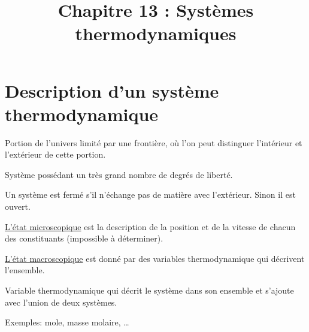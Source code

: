 \documentclass[12pt]{article}
\title{Chapitre 13 : Systèmes thermodynamiques}
\author{}
\date{}
\theoremstyle{cstyle}{\newtheorem{definition}{Définition}[section]}
\theoremstyle{cstyle}{\newtheorem{proposition}[definition]{Propriété}}
\theoremstyle{mystyle}{\newtheorem{theorem}[definition]{Théorème}}
\theoremstyle{mystyle}{\newtheorem{lemma}[definition]{Lemme}}
\theoremstyle{mystyle}{\newtheorem{corollary}[definition]{Corollaire}}
\theoremstyle{mystyle}{\newtheorem*{remark}{Remarque}}
\theoremstyle{mystyle}{\newtheorem*{remarks}{Remarques}}
\theoremstyle{mystyle}{\newtheorem*{example}{Exemple}}
\theoremstyle{mystyle}{\newtheorem*{examples}{Exemples}}
\theoremstyle{definition}{\newtheorem*{exercise}{Exercice}}
\theoremstyle{mystyle}{\newtheorem*{methode}{Méthode}}
\theoremstyle{cstyle}{\newtheorem*{cthm}{}}
\theoremstyle{warn}
\begin{document}
\maketitle

\begin{minipage}[t]{0.45\textwidth}
	\section{Description d'un système thermodynamique}
	\begin{definition}[Système]
		Portion de l'univers limité par une frontière, où l'on peut distinguer l'intérieur et l'extérieur de cette portion.
	\end{definition}
	\begin{definition}
		Système possédant un très grand nombre de degrés de liberté.
	\end{definition}
	\begin{definition}
		Un système est fermé s'il n'échange pas de matière avec l'extérieur. Sinon il est ouvert.
	\end{definition}
	\begin{definition}
		\underline{L'état microscopique} est la description de la position et de la vitesse de chacun des constituants (impossible à déterminer).
		
		\underline{L'état macroscopique} est donné par des variables thermodynamique qui décrivent l'ensemble.
	\end{definition}

	\begin{definition}
		Variable thermodynamique qui décrit le système dans son ensemble et s'ajoute avec l'union de deux systèmes.
		
		Exemples: mole, masse molaire, \dots
	\end{definition}

	
	
\end{minipage}
\hfill
\end{document}
